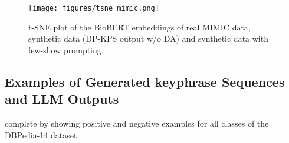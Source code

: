 \begin{figure}
 \centering
 \texttt{[image: figures/tsne\_mimic.png]}
 \caption{t-SNE plot of the BioBERT embeddings of real MIMIC data, synthetic data (DP-KPS output w/o DA) and synthetic data with few-show prompting.}
 \label{fig:tsne_biobert}
\end{figure}





\subsection{Examples of Generated keyphrase Sequences and LLM Outputs}
 complete  by showing positive and negative examples for all classes of the DBPedia-14 dataset. 

